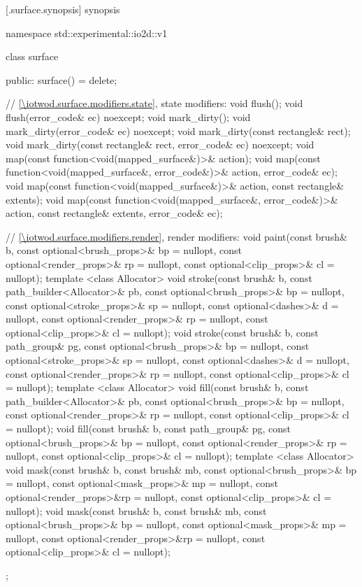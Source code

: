  [\iotwod.surface.synopsis] { synopsis}

\begin{codeblock}
namespace std::experimental::io2d::v1 {
  class surface {
  public:
    surface() = delete;
    
    // \ref{\iotwod.surface.modifiers.state}, state modifiers:
    void flush();
    void flush(error_code& ec) noexcept;
    void mark_dirty();
    void mark_dirty(error_code& ec) noexcept;
    void mark_dirty(const rectangle& rect);
    void mark_dirty(const rectangle& rect, error_code& ec) noexcept;
    void map(const function<void(mapped_surface&)>& action);
    void map(const function<void(mapped_surface&, error_code&)>& action,
      error_code& ec);
    void map(const function<void(mapped_surface&)>& action,
      const rectangle& extents);
    void map(const function<void(mapped_surface&, error_code&)>& action,
      const rectangle& extents, error_code& ec);

    // \ref{\iotwod.surface.modifiers.render}, render modifiers:
    void paint(const brush& b, const optional<brush_props>& bp = nullopt,
      const optional<render_props>& rp = nullopt,
      const optional<clip_props>& cl = nullopt);
    template <class Allocator>
    void stroke(const brush& b, const path_builder<Allocator>& pb,
      const optional<brush_props>& bp = nullopt,
      const optional<stroke_props>& sp = nullopt,
      const optional<dashes>& d = nullopt,
      const optional<render_props>& rp = nullopt,
      const optional<clip_props>& cl = nullopt);
    void stroke(const brush& b, const path_group& pg,
      const optional<brush_props>& bp = nullopt,
      const optional<stroke_props>& sp = nullopt,
      const optional<dashes>& d = nullopt,
      const optional<render_props>& rp = nullopt,
      const optional<clip_props>& cl = nullopt);
    template <class Allocator>
    void fill(const brush& b, const path_builder<Allocator>& pb,
      const optional<brush_props>& bp = nullopt,
      const optional<render_props>& rp = nullopt,
      const optional<clip_props>& cl = nullopt);
    void fill(const brush& b, const path_group& pg,
      const optional<brush_props>& bp = nullopt,
      const optional<render_props>& rp = nullopt,
      const optional<clip_props>& cl = nullopt);
    template <class Allocator>
    void mask(const brush& b, const brush& mb,
      const optional<brush_props>& bp = nullopt,
      const optional<mask_props>& mp = nullopt,
      const optional<render_props>&rp = nullopt,
      const optional<clip_props>& cl = nullopt);
    void mask(const brush& b, const brush& mb,
      const optional<brush_props>& bp = nullopt,
      const optional<mask_props>& mp = nullopt,
      const optional<render_props>&rp = nullopt,
      const optional<clip_props>& cl = nullopt);
  };
}
\end{codeblock}

